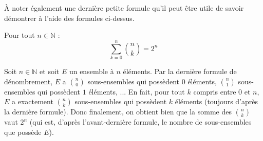 	\begin{nosummary}
		À noter également une dernière petite formule qu'il peut être utile de savoir démontrer à l'aide des formules ci-dessus.
		
		\begin{formula}
			Pour tout $n \in \mathbb{N}$ :
			\[ \sum_{k = 0}^n \binom{n}{k} = 2^n \]
		\end{formula}
		
		\begin{demonstration}
			Soit $n \in \mathbb{N}$ et soit $E$ un ensemble à $n$ éléments.
			\newpar
			Par la dernière formule de dénombrement, $E$ a $\binom{n}{0}$ sous-ensembles qui possèdent $0$ éléments, $\binom{n}{1}$ sous-ensembles qui possèdent $1$ éléments, ...
			\newpar
			En fait, pour tout $k$ compris entre $0$ et $n$, $E$ a exactement $\binom{n}{k}$ sous-ensembles qui possèdent $k$ éléments (toujours d'après la dernière formule).
			\newpar
			Donc finalement, on obtient bien que la somme des $\binom{n}{k}$ vaut $2^n$ (qui est, d'après l'avant-dernière formule, le nombre de sous-ensembles que possède $E$).
		\end{demonstration}
	\end{nosummary}
